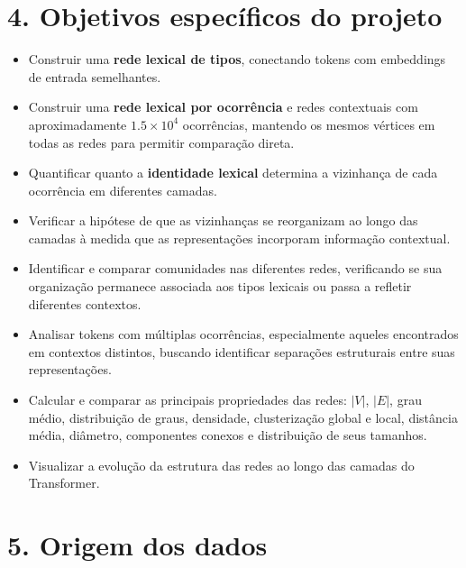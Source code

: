\documentclass[11pt,a4paper]{article}
\begin{document}
\section*{4. Objetivos específicos do projeto}

\begin{itemize}

    \item Construir uma \textbf{rede lexical de tipos},
    conectando tokens com embeddings de entrada
    semelhantes.

    \item Construir uma \textbf{rede lexical por ocorrência} e redes
    contextuais com aproximadamente $1.5\times10^4$ ocorrências, mantendo os
    mesmos vértices em todas as redes para permitir comparação direta.

    \item Quantificar quanto a \textbf{identidade lexical} determina a
    vizinhança de cada ocorrência em diferentes camadas.

    \item Verificar a hipótese de que as vizinhanças se reorganizam ao longo
    das camadas à medida que as representações incorporam informação
    contextual.

    \item Identificar e comparar comunidades nas diferentes redes,
    verificando se sua organização permanece associada aos tipos lexicais ou
    passa a refletir diferentes contextos.

    \item Analisar tokens com múltiplas ocorrências, especialmente aqueles
    encontrados em contextos distintos, buscando identificar separações
    estruturais entre suas representações.

    \item Calcular e comparar as principais propriedades das redes:
    $|V|$, $|E|$, grau médio, distribuição de graus, densidade,
    clusterização global e local, distância média, diâmetro, componentes
    conexos e distribuição de seus tamanhos.

    \item Visualizar a evolução da estrutura das redes ao longo das camadas do
    Transformer.

\end{itemize}

\section*{5. Origem dos dados}
\end{document}
